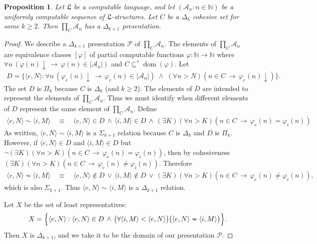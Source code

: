 \documentclass[11pt,a4paper,reqno]{amsart}
\newtheorem{Proposition}[Theorem]{Proposition}
\theoremstyle{definition}
\DeclareMathOperator{\dom}{\mathrm{dom}}
\newcommand{\la}{\langle}
\newcommand{\ra}{\rangle}
\newcommand{\da}{{\downarrow}}
\newcommand{\imp}{\rightarrow}
\newcommand{\Nb}{\mathbb{N}}
\newcommand{\mc}[1]{\mathcal{#1}}
\newcommand{\mf}[1]{\mathfrak{#1}}
\begin{document}
\begin{Proposition}\label{prop-Delta3Pres}
Let $\mf{L}$ be a computable language, and let $(\mc{A}_n : n \in \Nb)$ be a uniformly computable sequence of $\mf{L}$-structures.  Let $C$ be a $\Delta_k$ cohesive set for some $k \geq 2$.  Then $\prod_C \mc{A}_n$ has a $\Delta_{k+1}$ presentation.
\end{Proposition}

\begin{proof}
We describe a $\Delta_{k+1}$ presentation $\mc{P}$ of $\prod_C \mc{A}_n$.  The elements of $\prod_C \mc{A}_n$ are equivalence classes $[\varphi]$ of partial computable functions $\varphi \colon \Nb \to \Nb$ where $\forall n \, (\varphi(n)\da \,\imp\, \varphi(n) \in |\mc{A}_n|)$ and $C \subseteq^* \dom(\varphi)$.
Let
\begin{align*}
D = \{\la e, N \ra : \forall n \, (\varphi_e(n)\da \,\imp\, \varphi_e(n) \in |\mc{A}_n|) \;\land\; (\forall n > N)(n \in C \,\imp\, \varphi_e(n)\da)\}.
\end{align*}
The set $D$ is $\Pi_k$ because $C$ is $\Delta_k$ (and $k \geq 2$).  The elements of $D$ are intended to represent the elements of $\prod_C \mc{A}_n$.  Thus we must identify when different elements of $D$ represent the same element of $\prod_C \mc{A}_n$.
Define
\begin{align*}
\la e, N \ra \sim \la i, M \ra \quad\equiv\quad \la e, N \ra \in D \,\land\, \la i, M \ra \in D \,\land\, (\exists K)(\forall n > K)(n \in C \,\imp\, \varphi_e(n) = \varphi_i(n))
\end{align*}
As written, $\la e, N \ra \sim \la i, M \ra$ is a $\Sigma_{k+1}$ relation because $C$ is $\Delta_k$ and $D$ is $\Pi_k$.  However, if $\la e, N \ra \in D$ and $\la i, M \ra \in D$ but $\neg(\exists K)(\forall n > K)(n \in C \,\imp\, \varphi_e(n) = \varphi_i(n))$, then by cohesiveness $(\exists K)(\forall n > K)(n \in C \,\imp\, \varphi_e(n) \neq \varphi_i(n))$.  Therefore
\begin{align*}
\la e, N \ra \nsim \la i, M \ra \quad\equiv\quad \la e, N \ra \notin D \,\lor\, \la i, M \ra \notin D \,\lor\, (\exists K)(\forall n > K)(n \in C \,\imp\, \varphi_e(n) \neq \varphi_i(n)),
\end{align*}
which is also $\Sigma_{k+1}$.  Thus $\la e, N \ra \sim \la i, M \ra$ is a $\Delta_{k+1}$ relation.

Let $X$ be the set of least representatives:
\begin{align*}
X = \Bigl\{\la e, N \ra : \la e, N \ra \in D \,\land\, \bigl(\forall \la i, M \ra < \la e, N \ra\bigr)\bigl(\la e, N \ra \nsim \la i, M \ra\bigr)\Bigr\}.
\end{align*}
Then $X$ is $\Delta_{k+1}$, and we take it to be the domain of our presentation $\mc{P}$.


\end{proof}
\end{document}
